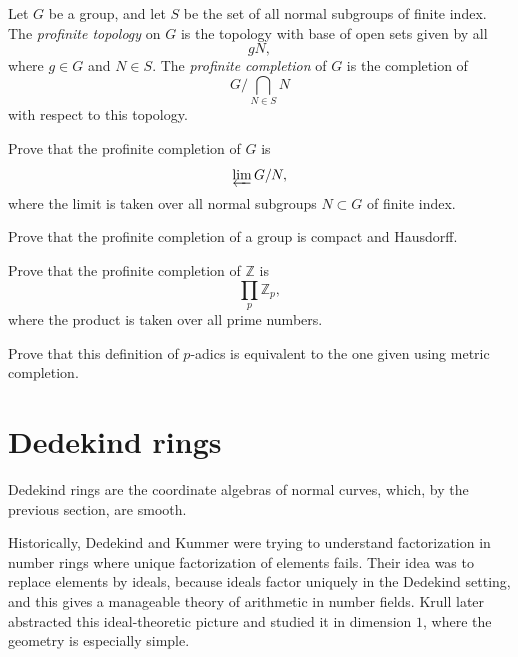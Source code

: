 \begin{definition}
\label{definition-profinite-topology}
Let $G$ be a group, and let $S$ be the
set of all normal subgroups of finite
index. The {\it profinite topology} on
$G$ is the topology with base of open
sets given by all
$$
gN,
$$
where $g \in G$ and $N \in S$. The
{\it profinite completion} of $G$ is
the completion of
$$
G/\bigcap_{N\in S}N
$$
with respect to this topology.
\end{definition}

\begin{exercise}
\label{exercise-profinite-completion-limit}
Prove that the profinite completion of
$G$ is
$$
\varprojlim G/N,
$$
where the limit is taken over all
normal subgroups $N \subset G$ of
finite index.
\end{exercise}

\begin{exercise}
\label{exercise-profinite-completion-compact}
Prove that the profinite completion of
a group is compact and Hausdorff.
\end{exercise}

\begin{exercise}
\label{exercise-profinite-completion-z}
Prove that the profinite completion of
$\mathbb Z$ is
$$
\prod_p \mathbb Z_p,
$$
where the product is taken over all
prime numbers.
\end{exercise}

\begin{exercise}
\label{exercise-equivalence-p-adic-definitions}
Prove that this definition of
$p$-adics is equivalent to the one
given using metric completion.
\end{exercise}

\section{Dedekind rings}
\label{section-dedekind-rings}

\noindent
Dedekind rings are the coordinate algebras
of normal curves, which, by the 
previous section, are smooth.

\medskip\noindent
Historically, Dedekind and Kummer were
trying to understand factorization in
number rings where unique factorization
of elements fails.
Their idea was to replace elements by
ideals, because ideals factor uniquely in
the Dedekind setting, and this gives a
manageable theory of arithmetic in
number fields.
Krull later abstracted this ideal-theoretic
picture and studied it in dimension $1$,
where the geometry is especially simple.

